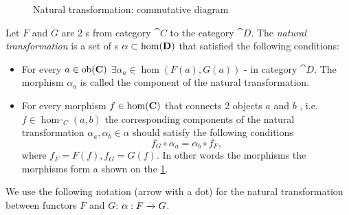 \begin{definition}
\label{def:nt}

\begin{figure}
  \centering
  \caption{Natural transformation: commutative diagram}
  \label{fig:nt_def}
\end{figure}

Let $F$ and $G$ are 2 s from category $\cat{C}$
to the category $\cat{D}$. The \textit{natural transformation} is a
set of s $\alpha \subset \mathrm{hom}(\mathbf{D})$ that
satisfied the following conditions:
\begin{itemize}
\item For every  $a \in \mathrm{ob}(\mathbf{C})$ $\exists
\alpha_a \in \hom\left(F(a), G(a)\right)$ - 
in category $\cat{D}$. The morphism $\alpha_a$ is called the component of
the natural transformation.
\item For every morphism $f \in \mathrm{hom}(\mathbf{C})$ that connects 2 objects
  $a$ and $b$ , i.e. $f \in \hom_{\cat{C}}(a,b)$ the corresponding components of
  the natural transformation $\alpha_a, \alpha_b \in \alpha$ should
  satisfy the following conditions
  \begin{equation}
    f_G \circ \alpha_a = \alpha_b \circ f_F,
    \label{eq:nt_definition}
  \end{equation}
  where $f_F = F(f), f_G = G(f)$.
  In other words the morphisms the morphisms form a
   shown on the \cref{fig:nt_def}. 
\end{itemize}

We use the following notation (arrow with a dot) for the natural transformation between
functors $F$ and $G$: $\alpha: F \xrightarrow{.} G$. 
\end{definition}


